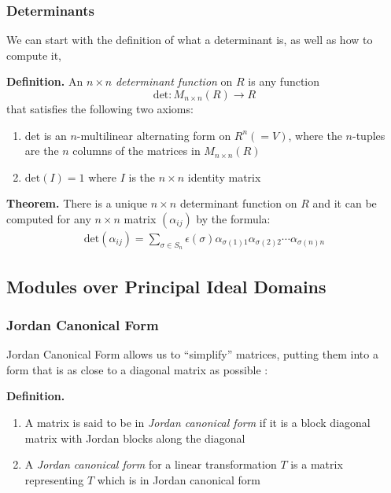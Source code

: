 \documentclass[11pt, reqno]{amsart}
\theoremstyle{plain}
\theoremstyle{definition}
\theoremstyle{example}
\begin{document}
\subsubsection{Determinants}

We can start with the definition of what a determinant is, as well as how to compute it,

\par
\textbf{Definition.} An $n \times n$ \textit{determinant function} on $R$ is any function $$\text{det}: M_{n \times n}(R) \to R$$that satisfies the following two axioms:
\begin{enumerate}
\item det is an $n$-multilinear alternating form on $R^n (= V)$, where the $n$-tuples are the $n$ columns of the matrices in $M_{n \times n}(R)$
\item $\text{det}(I) = 1$ where $I$ is the $n \times n$ identity matrix
\end{enumerate}

\par
\textbf{Theorem.} There is a unique $n \times n$ determinant function on $R$ and it can be computed for any $n \times n$ matrix $(\alpha_{ij})$ by the formula:
\begin{align*}
\text{det}(\alpha_{ij}) = \sum_{\sigma \in S_n} \epsilon(\sigma) \alpha_{\sigma(1)1}\alpha_{\sigma(2)2}\cdots \alpha_{\sigma(n)n}
\end{align*}



\subsection{Modules over Principal Ideal Domains}

\subsubsection{Jordan Canonical Form}

Jordan Canonical Form allows us to ``simplify'' matrices, putting them into a form that is as close to a diagonal matrix as possible \cite[\S 11.3, p. 431]{dummit}:

\par
\textbf{Definition.}
\begin{enumerate}
\item A matrix is said to be in \textit{Jordan canonical form} if it is a block diagonal matrix with Jordan blocks along the diagonal
\item A \textit{Jordan canonical form} for a linear transformation $T$ is a matrix representing $T$ which is in Jordan canonical form
\end{enumerate}
\end{document}

